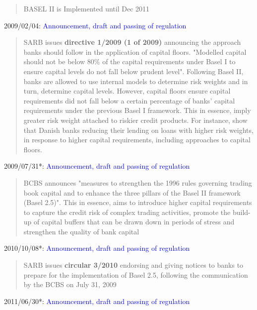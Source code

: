\documentclass[
  letterpaper,
  DIV=11,
  numbers=noendperiod]{scrartcl}
\begin{document}
\begin{quote}
            BASEL II is  Implemented until Dec 2011
\end{quote}

2009/02/04:
\textcolor{blue}{Announcement, draft and passing of regulation}

\begin{quote}SARB issues  \textbf{directive 1/2009 (1 of 2009)} announcing the approach banks should follow in the application of capital floors. "Modelled capital should not be below 80\% of the capital requirements under Basel I to ensure capital levels do not fall below prudent level". Following Basel II, banks are allowed to use internal models to determine risk weights and in turn, determine capital levels. However, capital floors ensure capital requirements did not fall below a certain percentage of banks’ capital requirements under the previous Basel I framework\citep{basel06}. This in essence, imply greater risk weight attached to riskier credit products. For instance,  \cite{imbierowicz2018time} show that Danish banks reducing their lending on loans with higher risk weights, in response to higher capital requirements, including approaches to capital floors.
 \end{quote}

2009/07/31*:
\textcolor{blue}{Announcement, draft and passing of regulation}

\begin{quote}BCBS announces "measures to strengthen the 1996 rules governing trading book capital and to enhance the three pillars of the Basel II framework (Basel 2.5)". This in essence, aims  to introduce higher capital requirements to capture the credit risk of complex trading activities, promote the build-up of capital buffers that can be drawn down in periods of stress and strengthen the quality of bank capital\citep{basel09}
                \end{quote}

2010/10/08*:
\textcolor{blue}{Announcement, draft and passing of regulation}

\begin{quote}SARB issues \textbf{circular 3/2010} endorsing and giving notices to banks to prepare for the implementation of Basel 2.5, following the communication by the BCBS on July 31, 2009

\end{quote}

2011/06/30*:
\textcolor{blue}{Announcement, draft and passing of regulation}
\end{document}
